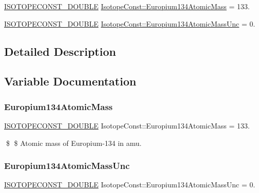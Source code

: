 \begin{DoxyCompactItemize}
\item 
\mbox{\hyperlink{group___isotope_const-_macros_ga8f45a7272ce02c0b4c65c44636ed719a}{I\+S\+O\+T\+O\+P\+E\+C\+O\+N\+S\+T\+\_\+\+D\+O\+U\+B\+LE}} \mbox{\hyperlink{group___isotope_const-_europium-_eu134_ga30c908f4f34e029f42538c98efad613f}{Isotope\+Const\+::\+Europium134\+Atomic\+Mass}} = 133.
\item 
\mbox{\hyperlink{group___isotope_const-_macros_ga8f45a7272ce02c0b4c65c44636ed719a}{I\+S\+O\+T\+O\+P\+E\+C\+O\+N\+S\+T\+\_\+\+D\+O\+U\+B\+LE}} \mbox{\hyperlink{group___isotope_const-_europium-_eu134_ga7835b310163dd0d90e371558568300f3}{Isotope\+Const\+::\+Europium134\+Atomic\+Mass\+Unc}} = 0.
\end{DoxyCompactItemize}


\subsection{Detailed Description}


\subsection{Variable Documentation}
\mbox{\label{group___isotope_const-_europium-_eu134_ga30c908f4f34e029f42538c98efad613f}} 
\subsubsection{\texorpdfstring{Europium134\+Atomic\+Mass}{Europium134AtomicMass}}
{\footnotesize\ttfamily \mbox{\hyperlink{group___isotope_const-_macros_ga8f45a7272ce02c0b4c65c44636ed719a}{I\+S\+O\+T\+O\+P\+E\+C\+O\+N\+S\+T\+\_\+\+D\+O\+U\+B\+LE}} Isotope\+Const\+::\+Europium134\+Atomic\+Mass = 133.}

\$ \$ Atomic mass of Europium-\/134 in amu. \mbox{\label{group___isotope_const-_europium-_eu134_ga7835b310163dd0d90e371558568300f3}} 
\subsubsection{\texorpdfstring{Europium134\+Atomic\+Mass\+Unc}{Europium134AtomicMassUnc}}
{\footnotesize\ttfamily \mbox{\hyperlink{group___isotope_const-_macros_ga8f45a7272ce02c0b4c65c44636ed719a}{I\+S\+O\+T\+O\+P\+E\+C\+O\+N\+S\+T\+\_\+\+D\+O\+U\+B\+LE}} Isotope\+Const\+::\+Europium134\+Atomic\+Mass\+Unc = 0.}

